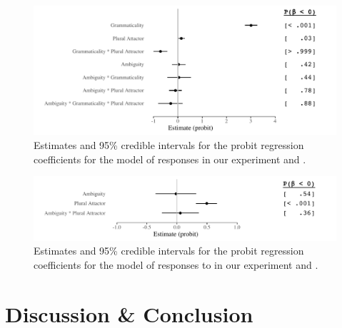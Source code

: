 \documentclass[]{interact}\usepackage[]{graphicx}\usepackage[]{color}
\newenvironment{knitrout}{}{} %
\theoremstyle{plain}%
\theoremstyle{definition}
\theoremstyle{remark}
\begin{document}
\begin{knitrout}
\color{fgcolor}\begin{figure}[hbt!]

{\centering \includegraphics[width=\linewidth]{figure/ResponseModel-1} 

}

\caption{Estimates and 95\% credible intervals for the probit regression coefficients for the model of responses in our experiment and \citet{LagoEtAl:2019}.}\label{fig:ResponseModel}
\end{figure}

\end{knitrout}

\begin{knitrout}
\color{fgcolor}\begin{figure}[hbt!]

{\centering \includegraphics[width=\linewidth]{figure/ResponseModelUngram-1} 

}

\caption{Estimates and 95\% credible intervals for the probit regression coefficients for the model of responses to  in our experiment and \citet{LagoEtAl:2019}.}\label{fig:ResponseModelUngram}
\end{figure}

\end{knitrout}


\section{Discussion \& Conclusion}
\end{document}
